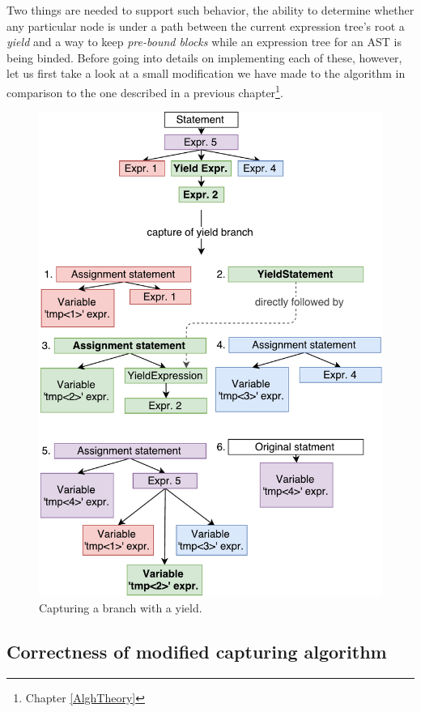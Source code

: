 Two things are needed to support such behavior, the ability to determine whether any particular node is under a path between the current expression tree’s root a \emph{yield} and a way to keep \emph{pre-bound blocks} while an expression tree for an AST is being binded. Before going into details on implementing each of these, however, let us first take a look at a small modification we have made to the algorithm in comparison to the one described in a previous chapter\footnote{Chapter \ref{AlghTheory}}.

\begin{figure}[H]
	\centering	
	\includegraphics[scale=0.75]{../img/5_3_branchesWithYields}	
	\caption{Capturing a branch with a yield.}
	\label{fig5.3:CaptureWithYield}
\end{figure}

\subsection{Correctness of modified capturing algorithm}

